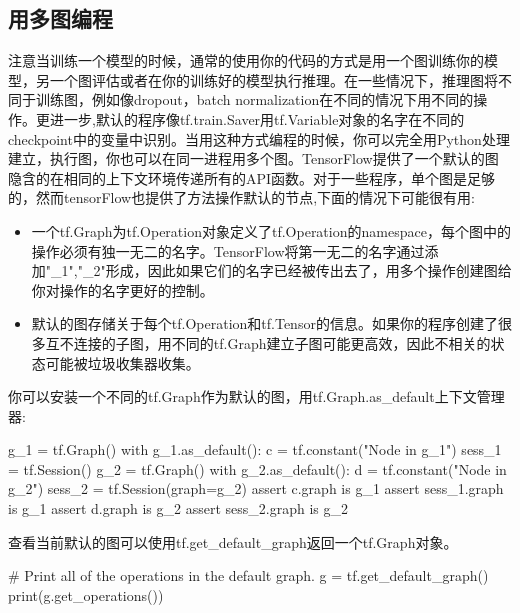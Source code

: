 \subsection{用多图编程}
注意当训练一个模型的时候，通常的使用你的代码的方式是用一个图训练你的模型，另一个图评估或者在你的训练好的模型执行推理。在一些情况下，推理图将不同于训练图，例如像dropout，batch normalization在不同的情况下用不同的操作。更进一步,默认的程序像tf.train.Saver用tf.Variable对象的名字在不同的checkpoint中的变量中识别。当用这种方式编程的时候，你可以完全用Python处理建立，执行图，你也可以在同一进程用多个图。TensorFlow提供了一个默认的图隐含的在相同的上下文环境传递所有的API函数。对于一些程序，单个图是足够的，然而tensorFlow也提供了方法操作默认的节点,下面的情况下可能很有用:
\begin{itemize}
	\item 一个tf.Graph为tf.Operation对象定义了tf.Operation的namespace，每个图中的操作必须有独一无二的名字。TensorFlow将第一无二的名字通过添加"\_1","\_2"形成，因此如果它们的名字已经被传出去了，用多个操作创建图给你对操作的名字更好的控制。
	\item 默认的图存储关于每个tf.Operation和tf.Tensor的信息。如果你的程序创建了很多互不连接的子图，用不同的tf.Graph建立子图可能更高效，因此不相关的状态可能被垃圾收集器收集。
\end{itemize}
你可以安装一个不同的tf.Graph作为默认的图，用tf.Graph.as\_default上下文管理器:
\begin{python}
g_1 = tf.Graph()
with g_1.as_default():
    c = tf.constant("Node in g_1")
    sess_1 = tf.Session()
g_2 = tf.Graph()
with g_2.as_default():
    d = tf.constant("Node in g_2")
sess_2 = tf.Session(graph=g_2)
assert c.graph is g_1
assert sess_1.graph is g_1
assert d.graph is g_2
assert sess_2.graph is g_2
\end{python}
查看当前默认的图可以使用tf.get\_default\_graph返回一个tf.Graph对象。
\begin{python}
# Print all of the operations in the default graph.
g = tf.get_default_graph()
print(g.get_operations())
\end{python}
